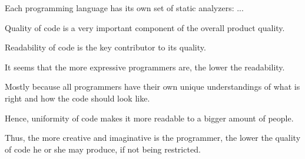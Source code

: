 \documentclass{main}
\begin{document}
Each programming language has its own set of static analyzers: ...

Quality of code is a very important component of the overall product quality.

Readability of code is the key contributor to its quality.

It seems that the more expressive programmers are, the lower the readability.

Mostly because all programmers have their own unique understandings of what is right and how the code should look like.

Hence, uniformity of code makes it more readable to a bigger amount of people.

Thus, the more creative and imaginative is the programmer, the lower the quality of code he or she may produce, if not being restricted.
\end{document}
